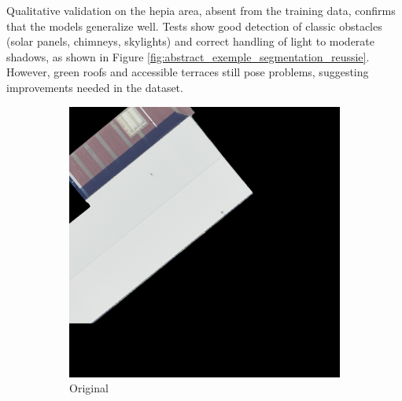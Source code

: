 Qualitative validation on the \acrshort{hepia} area, absent from the training data, confirms that the models generalize well. Tests show good detection of classic obstacles (solar panels, chimneys, skylights) and correct handling of light to moderate shadows, as shown in Figure \ref{fig:abstract_exemple_segmentation_reussie}. However, green roofs and accessible terraces still pose problems, suggesting improvements needed in the dataset.

\begin{figure}[htbp]
    \centering
    \begin{subfigure}{0.32\textwidth}
        \includegraphics[width=\textwidth]{02-main//figures/ch4/kfold_ensembles/linknet_timm-efficientnet-b5/best_cases/best_3_iou0.986_24931117_tile_18_5_f475a0_original.png}
        \caption{Original}
    \end{subfigure}
    \hfill
    \begin{subfigure}{0.32\textwidth}

\end{subfigure}
\end{figure}
